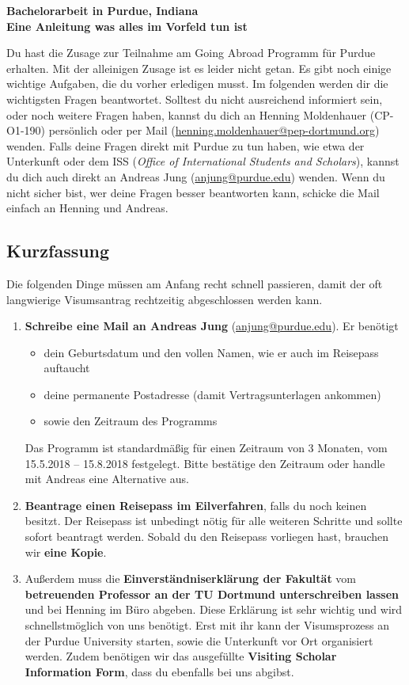 \documentclass[
  paper=a4,
  fontsize=12pt,
  DIV=16,
  headheight=52pt,
  footheight=45pt,
  headinclude,
  parskip=full,
]{scrartcl}
\date{10. October 2017}
\begin{document}
\textbf{\Huge\sffamily Bachelorarbeit in Purdue, Indiana}\\[0.5\baselineskip]
\textbf{\Large\sffamily Eine Anleitung was alles im Vorfeld tun ist}

Du hast die Zusage zur Teilnahme am Going Abroad Programm für Purdue erhalten.
Mit der alleinigen Zusage ist es leider nicht getan.
Es gibt noch einige wichtige Aufgaben, die du vorher erledigen musst.
Im folgenden werden dir die wichtigsten Fragen beantwortet.
Solltest du nicht ausreichend informiert sein, oder noch weitere Fragen haben,
kannst du dich an Henning Moldenhauer (CP-O1-190) persönlich oder per Mail
(\href{mailto:henning.moldenhauer@pep-dortmund.org}{henning.moldenhauer@pep-dortmund.org}) wenden.
Falls deine Fragen direkt mit Purdue zu tun haben, wie etwa der Unterkunft oder
dem ISS (\textit{Office of International Students and Scholars}), kannst du dich auch direkt an Andreas Jung (\href{mailto:anjung@purdue.edu}{anjung@purdue.edu}) wenden.
Wenn du nicht sicher bist, wer deine Fragen besser beantworten kann, schicke die Mail einfach an Henning und Andreas.


\subsection*{Kurzfassung}
Die folgenden Dinge müssen am Anfang recht schnell passieren, damit der oft langwierige Visumsantrag rechtzeitig abgeschlossen werden kann.
\begin{enumerate}
  \item \textbf{Schreibe eine Mail an Andreas Jung} (\href{mailto:anjung@purdue.edu}{anjung@purdue.edu}).
    Er benötigt
    \begin{itemize}
      \item dein Geburtsdatum und den vollen Namen, wie er auch im Reisepass auftaucht
      \item deine permanente Postadresse (damit Vertragsunterlagen ankommen)
      \item sowie den Zeitraum des Programms
    \end{itemize}
    Das Programm ist standardmäßig für einen Zeitraum von 3 Monaten, vom 15.5.2018 – 15.8.2018 festgelegt.
    Bitte bestätige den Zeitraum oder handle mit Andreas eine Alternative aus.
  \item \textbf{Beantrage einen Reisepass im Eilverfahren}, falls du noch keinen besitzt.
    Der Reisepass ist unbedingt nötig für alle weiteren Schritte und sollte sofort beantragt werden.
    Sobald du den Reisepass vorliegen hast, brauchen wir \textbf{eine Kopie}.
  \item Außerdem muss die \textbf{Einverständniserklärung der Fakultät} vom \textbf{betreuenden Professor an der TU Dortmund unterschreiben lassen} und bei Henning im Büro abgeben.
  Diese Erklärung ist sehr wichtig und wird schnellstmöglich von uns benötigt.
  Erst mit ihr kann der Visumsprozess an der Purdue University starten, sowie die Unterkunft vor Ort organisiert werden.
  Zudem benötigen wir das ausgefüllte \textbf{Visiting Scholar Information Form}, dass du ebenfalls bei uns abgibst.
\end{enumerate}
\end{document}
